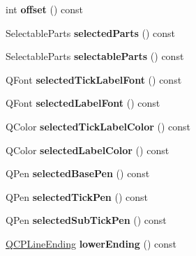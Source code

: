 \begin{DoxyCompactItemize}
\item 
\hypertarget{classQCPAxis_aebc032ac6eea164a02859c017f52d5e7}{}int {\bfseries offset} () const \label{classQCPAxis_aebc032ac6eea164a02859c017f52d5e7}

\item 
\hypertarget{classQCPAxis_a08323248a1cba4750ef07ceea159e0b3}{}Selectable\+Parts {\bfseries selected\+Parts} () const \label{classQCPAxis_a08323248a1cba4750ef07ceea159e0b3}

\item 
\hypertarget{classQCPAxis_ad2bff3d2ed3d35c10d44c0c02441bd2c}{}Selectable\+Parts {\bfseries selectable\+Parts} () const \label{classQCPAxis_ad2bff3d2ed3d35c10d44c0c02441bd2c}

\item 
\hypertarget{classQCPAxis_ae245bb3dcd0ec71eee38437de6e719f7}{}Q\+Font {\bfseries selected\+Tick\+Label\+Font} () const \label{classQCPAxis_ae245bb3dcd0ec71eee38437de6e719f7}

\item 
\hypertarget{classQCPAxis_a078bbc88b33595a5308350c2889c96d4}{}Q\+Font {\bfseries selected\+Label\+Font} () const \label{classQCPAxis_a078bbc88b33595a5308350c2889c96d4}

\item 
\hypertarget{classQCPAxis_a5a3af4bd1a820bb7c6d4c85e1d8d452f}{}Q\+Color {\bfseries selected\+Tick\+Label\+Color} () const \label{classQCPAxis_a5a3af4bd1a820bb7c6d4c85e1d8d452f}

\item 
\hypertarget{classQCPAxis_a8cf8de6ac7f1ca617e05412f669ed229}{}Q\+Color {\bfseries selected\+Label\+Color} () const \label{classQCPAxis_a8cf8de6ac7f1ca617e05412f669ed229}

\item 
\hypertarget{classQCPAxis_a5a3919ad7b60c2789b04c7e72387cfd6}{}Q\+Pen {\bfseries selected\+Base\+Pen} () const \label{classQCPAxis_a5a3919ad7b60c2789b04c7e72387cfd6}

\item 
\hypertarget{classQCPAxis_a9f86ef82e1d1a908ab4c68cfa5fe4175}{}Q\+Pen {\bfseries selected\+Tick\+Pen} () const \label{classQCPAxis_a9f86ef82e1d1a908ab4c68cfa5fe4175}

\item 
\hypertarget{classQCPAxis_a1b264fdfef48c22aba36e76de7856784}{}Q\+Pen {\bfseries selected\+Sub\+Tick\+Pen} () const \label{classQCPAxis_a1b264fdfef48c22aba36e76de7856784}

\item 
\hypertarget{classQCPAxis_ac85aebbedf67d7bc9e1e5c182151536b}{}\hyperlink{classQCPLineEnding}{Q\+C\+P\+Line\+Ending} {\bfseries lower\+Ending} () const \label{classQCPAxis_ac85aebbedf67d7bc9e1e5c182151536b}


\end{DoxyCompactItemize}
